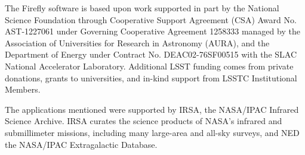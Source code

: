 \documentclass[11pt,twoside]{article}
\begin{document}
\acknowledgements

The Firefly software is based upon work supported in part by the National
Science Foundation through Cooperative Support Agreement (CSA) Award No. AST-1227061 under Governing
Cooperative Agreement 1258333 managed by the Association of Universities for Research in Astronomy (AURA), and
the Department of Energy under Contract No. DEAC02-76SF00515 with the SLAC National Accelerator Laboratory.
Additional LSST funding comes from private donations, grants to universities, and in-kind support from LSSTC
Institutional Members.

\smallskip
The applications mentioned were supported by IRSA, the NASA/IPAC Infrared Science Archive. IRSA curates the science
products of NASA's infrared and submillimeter missions, including many large-area and all-sky surveys, and NED the NASA/IPAC Extragalactic Database.

\end{document}
